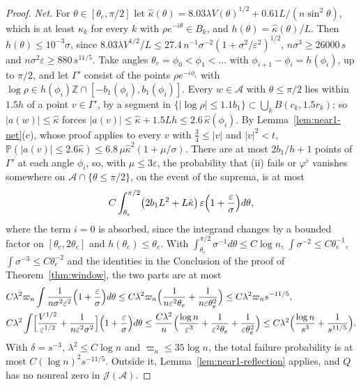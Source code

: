 \documentclass[11pt]{amsart}
\theoremstyle{definition}
\theoremstyle{remark}
\numberwithin{equation}{section}
\newcommand{\Z}{\mathbb{Z}}
\newcommand{\PP}{\mathbb{P}}
\newcommand{\eps}{\varepsilon}
\begin{document}
\begin{proof}
\emph{Net.} For $\theta\in[\theta_e,\pi/2]$ let $\hat\kappa(\theta)=8.03\lambda V(\theta)^{1/2}+0.61L/(n\sin^2\theta)$, which is at least $\hat\kappa_k$ for every $k$ with $\rho e^{-i\theta}\in B_k$, and $h(\theta)=\hat\kappa(\theta)/L$. Then $h(\theta)\le10^{-3}\sigma$, since $8.03\lambda V^{1/2}/L\le27.4\,n^{-1}\sigma^{-2}(1+\sigma^2/\eps^2)^{1/2}$, $n\sigma^3\ge26000\,s$ and $n\sigma^2\eps\ge880\,s^{11/5}$. Take angles $\theta_e=\phi_0<\phi_1<\dots$ with $\phi_{i+1}-\phi_i=h(\phi_i)$, up to $\pi/2$, and let $\Gamma'$ consist of the points $\rho e^{-i\phi_i}$ with $\log\rho\in h(\phi_i)\Z\cap[-b_1(\phi_i),b_1(\phi_i)]$. Every $w\in\mathcal A$ with $\theta\le\pi/2$ lies within $1.5h$ of a point $v\in\Gamma'$, by a segment in $\{|\log\rho|\le1.1b_1\}\subset\bigcup_kB(c_k,1.5r_k)$; so $|a(w)|\le\hat\kappa$ forces $|a(v)|\le\hat\kappa+1.5Lh\le2.6\,\hat\kappa(\phi_i)$. By Lemma~\ref{lem:near1-net}(c), whose proof applies to every $v$ with $\frac34\le|v|$ and $|v|^2<t$, $\PP(|a(v)|\le2.6\hat\kappa)\le6.8\,\mu\hat\kappa^2(1+\mu/\sigma)$. There are at most $2b_1/h+1$ points of $\Gamma'$ at each angle $\phi_i$, so, with $\mu\le3\eps$, the probability that (ii) fails or $\varphi^\flat$ vanishes somewhere on $\mathcal A\cap\{\theta\le\pi/2\}$, on the event of the suprema, is at most
\[
C\int_{\theta_e}^{\pi/2}\bigl(2b_1L^2+L\hat\kappa\bigr)\,\eps\Bigl(1+\frac\eps\sigma\Bigr)d\theta ,
\]
where the term $i=0$ is absorbed, since the integrand changes by a bounded factor on $[\theta_e,2\theta_e]$ and $h(\theta_e)\le\theta_e$. With $\int_{\theta_e}^{\pi/2}\sigma^{-1}d\theta\le C\log n$, $\int\sigma^{-2}\le C\theta_e^{-1}$, $\int\sigma^{-3}\le C\theta_e^{-2}$ and the identities in the Conclusion of the proof of Theorem~\ref{thm:window}, the two parts are at most
\begin{align*}
&C\lambda^2\varpi_n\int\frac{1}{n\sigma^2\eps^2}\Bigl(1+\frac\eps\sigma\Bigr)d\theta\le C\lambda^2\varpi_n\Bigl(\frac1{n\eps^2\theta_e}+\frac1{n\eps\theta_e^2}\Bigr)\le C\lambda^2\varpi_ns^{-11/5},\\
&C\lambda^2\int\Bigl[\frac{V^{1/2}}{\eps^{1/2}}+\frac1{n\eps^2\sigma^2}\Bigr]\Bigl(1+\frac\eps\sigma\Bigr)d\theta\le\frac{C\lambda^2}n\Bigl(\frac{\log n}{\eps^3}+\frac1{\eps^2\theta_e}+\frac1{\eps\theta_e^2}\Bigr)\le C\lambda^2\Bigl(\frac{\log n}{s^3}+\frac1{s^{11/5}}\Bigr).
\end{align*}
With $\delta=s^{-3}$, $\lambda^2\le C\log n$ and $\varpi_n\le35\log n$, the total failure probability is at most $C(\log n)^2s^{-11/5}$. Outside it, Lemma~\ref{lem:near1-reflection} applies, and $Q$ has no nonreal zero in $\mathcal J(\mathcal A)$.
\end{proof}
\end{document}
